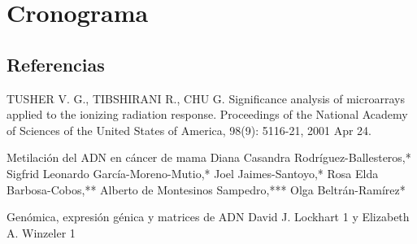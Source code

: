 \documentclass[12pt,letterpaper]{article}
\begin{document}
\section{Cronograma}

\subsection{Referencias}


TUSHER V. G., TIBSHIRANI R., CHU G. Significance analysis of microarrays applied
to the ionizing radiation response. Proceedings of the National Academy of Sciences of
the United States of America, 98(9): 5116-21, 2001 Apr 24.

Metilación del ADN en cáncer de mama
Diana Casandra Rodríguez-Ballesteros,*
Sigfrid Leonardo García-Moreno-Mutio,* Joel Jaimes-Santoyo,* Rosa Elda Barbosa-Cobos,**
Alberto de Montesinos Sampedro,*** Olga Beltrán-Ramírez*

Genómica, expresión génica y matrices de ADN
David J. Lockhart 1 y Elizabeth A. Winzeler 1

\end{document}
